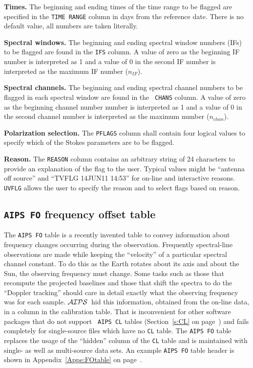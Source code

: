 \documentclass[twoside]{article}
\newcommand{\AIPS}{{$\cal AIPS\/$}}
\newcommand{\nif}{$n_{IF}$}
\newcommand{\nchan}{$n_{chan}$}
\begin{document}
{\bf Times.} The beginning and ending times of the time range to be
flagged are specified in the {\tt TIME RANGE} column in days from the
reference date.  There is no default value, all numbers are taken
literally.

{\bf Spectral windows.} The beginning and ending spectral window
numbers (IFs) to be flagged are found in the {\tt IFS} column.  A
value of zero as the beginning IF number is interpreted as 1 and a
value of 0 in the second IF number is interpreted as the maximum IF
number (\nif).

{\bf Spectral channels.}  The beginning and ending spectral channel
numbers to be flagged in each spectral window are found in the {\tt
  CHANS} column.  A value of zero as the beginning channel number
number is interpreted as 1 and a value of 0 in the second channel
number is interpreted as the maximum number (\nchan).

{\bf Polarization selection.} The {\tt PFLAGS} column shall contain
four logical values to specify which of the Stokes parameters are to
be flagged.

{\bf Reason.} The {\tt REASON} column contains an arbitrary string of
24 characters to provide an explanation of the flag to the user.
Typical values might be ``antenna off source'' and ``TVFLG 14JUN11
14:53'' for on-line and interactive reasons.  {\tt UVFLG} allows the
user to specify the reason and to select flags based on reason.

\vfill\eject
\subsection{{\tt AIPS FO} frequency offset table}
\label{s:FO}

The {\tt AIPS FO} table is a recently invented table to convey
information about frequency changes occurring during the observation.
Frequently spectral-line observations are made while keeping the
``velocity'' of a particular spectral channel constant.  To do this as
the Earth rotates about its axis and about the Sun, the observing
frequency must change.  Some tasks such as those that recompute the
projected baselines and those that shift the spectra to do the
``Doppler tracking'' should care in detail exactly what the observing
frequency was for each sample.  \AIPS\ hid this information, obtained
from the on-line data, in a column in the calibration table.  That is
inconvenient for other software packages that do not support {\tt
  AIPS CL} tables (Section~\ref{s:CL} on page~\pageref{s:CL}) and
fails completely for single-source files which have no {\tt CL} table.
The {\tt AIPS FO} table replaces the usage of the ``hidden'' column
of the {\tt CL} table and is maintained with single- as well as
multi-source data sets.  An example {\tt AIPS FO} table header is
shown in Appendix~\ref{Appe:FOtable} on page~\pageref{Appe:FOtable}.
\end{document}
